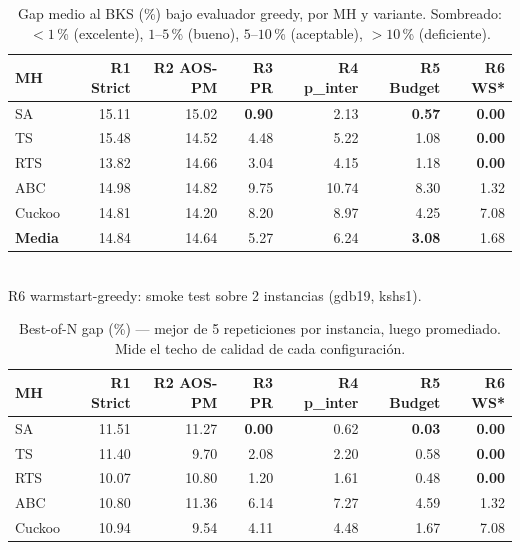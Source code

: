 \begin{table}[h]
\centering
\caption{Gap medio al BKS (\%) bajo evaluador greedy, por MH y variante.
         Sombreado: $< 1$\,\% (excelente), $1$--$5$\,\% (bueno),
         $5$--$10$\,\% (aceptable), $> 10$\,\% (deficiente).}
\label{tab:re-greedy-gap}
\small
\begin{tabular}{lrrrrrr}
\toprule
MH & R1 Strict & R2 AOS-PM & R3 PR & R4 p\_inter & R5 Budget & R6 WS* \\
\midrule
SA      & 15.11 & 15.02 & \textbf{0.90} & 2.13 & \textbf{0.57} & \textbf{0.00} \\
TS      & 15.48 & 14.52 & 4.48          & 5.22 & 1.08          & \textbf{0.00} \\
RTS     & 13.82 & 14.66 & 3.04          & 4.15 & 1.18          & \textbf{0.00} \\
ABC     & 14.98 & 14.82 & 9.75          & 10.74 & 8.30         & 1.32 \\
Cuckoo  & 14.81 & 14.20 & 8.20          & 8.97  & 4.25         & 7.08 \\
\midrule
\textbf{Media} & 14.84 & 14.64 & 5.27 & 6.24 & \textbf{3.08} & 1.68 \\
\bottomrule
\end{tabular}
\\[4pt]
\footnotesize *R6 warmstart-greedy: smoke test sobre 2 instancias (gdb19, kshs1).
\end{table}

\begin{table}[h]
\centering
\caption{Best-of-N gap (\%) — mejor de 5 repeticiones por instancia,
         luego promediado. Mide el techo de calidad de cada configuración.}
\label{tab:re-greedy-bon}
\small
\begin{tabular}{lrrrrrr}
\toprule
MH & R1 Strict & R2 AOS-PM & R3 PR & R4 p\_inter & R5 Budget & R6 WS* \\
\midrule
SA      & 11.51 & 11.27 & \textbf{0.00} & 0.62 & \textbf{0.03} & \textbf{0.00} \\
TS      & 11.40 &  9.70 & 2.08          & 2.20 & 0.58          & \textbf{0.00} \\
RTS     & 10.07 & 10.80 & 1.20          & 1.61 & 0.48          & \textbf{0.00} \\
ABC     & 10.80 & 11.36 & 6.14          & 7.27 & 4.59          & 1.32 \\
Cuckoo  & 10.94 &  9.54 & 4.11          & 4.48 & 1.67          & 7.08 \\
\bottomrule
\end{tabular}
\end{table}


